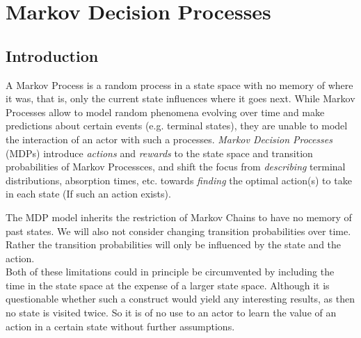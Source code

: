\chapter{Markov Decision Processes}
\section{Introduction}
A Markov Process is a random process in a state space with no memory of where it was, that is, only the current state influences where it goes next.
While Markov Processes allow to model random phenomena evolving over time and make predictions about certain events (e.g. terminal states), they are unable to model the interaction of an actor with such a processes. \emph{Markov Decision Processes} (MDPs) introduce \emph{actions} and \emph{rewards} to the state space and transition probabilities of Markov Processces, and shift the focus from \emph{describing} terminal distributions, absorption times, etc. towards \emph{finding} the optimal action(s) to take in each state (If such an action exists).

The MDP model inherits the restriction of Markov Chains to have no memory of past states. We will also not consider changing transition probabilities over time. Rather the transition probabilities will only be influenced by the state and the action. \\
Both of these limitations could in principle be circumvented by including the time in the state space at the expense of a larger state space. Although it is questionable whether such a construct would yield any interesting results, as then no state is visited twice. So it is of no use to an actor to learn the value of an action in a certain state without further assumptions.

